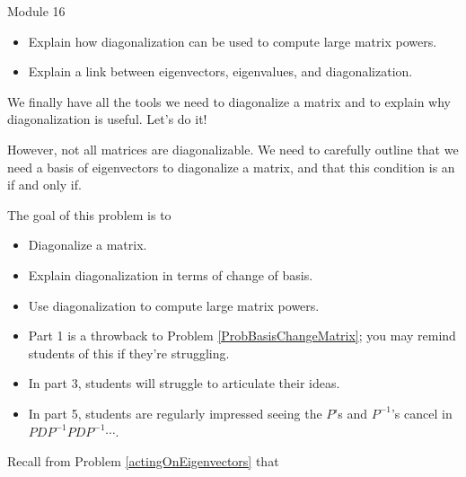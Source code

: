 \begin{lesson}

	Module 16

	\begin{itemize}
		\item Explain how diagonalization can be used to compute large matrix powers.
		\item Explain a link between eigenvectors, eigenvalues, and diagonalization.

	\end{itemize}

	We finally have all the tools we need to diagonalize a matrix and to explain why diagonalization is useful.
	Let's do it!

	However, not all matrices are diagonalizable. We need to carefully outline that we need a
	basis of eigenvectors to diagonalize a matrix, and that this condition is an if and only if.

\end{lesson}
	\bookonlynewpage
	\question
	\begin{annotation}
		\begin{goals}

			The goal of this problem is to
			\begin{itemize}
				\item Diagonalize a matrix.
				\item Explain diagonalization in terms of change of basis.
				\item Use diagonalization to compute large matrix powers.
			\end{itemize}
		\end{goals}

		\begin{notes}
			\begin{itemize}
				\item Part 1 is a throwback to Problem \ref{ProbBasisChangeMatrix}; you may remind students
					of this if they're struggling.
				\item In part 3, students will struggle to articulate their ideas.
				\item In part 5, students are regularly impressed seeing the $P$'s and
					$P^{-1}$'s cancel in $PDP^{-1}PDP^{-1}\cdots$.
			\end{itemize}
		\end{notes}
	\end{annotation}
	Recall from Problem \ref{actingOnEigenvectors} that
